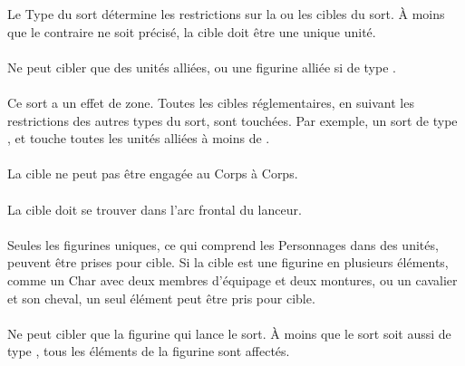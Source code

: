 Le Type du sort détermine les restrictions sur la ou les cibles du sort. À moins que le contraire ne soit précisé, la cible doit être une unique unité.

\paragraph{\augment}

Ne peut cibler que des unités alliées, ou une figurine alliée si de type \focused{}.

\paragraph{\aura}

Ce sort a un effet de zone. Toutes les cibles réglementaires, en suivant les restrictions des autres types du sort, sont touchées. Par exemple, un sort de type \aura{}, \augment{} et  touche toutes les unités alliées à moins de .

\paragraph{\damage}

La cible ne peut pas être engagée au Corps à Corps.

\paragraph{\direct}

La cible doit se trouver dans l'arc frontal du lanceur.

\paragraph{\focused}

Seules les figurines uniques, ce qui comprend les Personnages dans des unités, peuvent être prises pour cible. Si la cible est une figurine en plusieurs éléments, comme un Char avec deux membres d'équipage et deux montures, ou un cavalier et son cheval, un seul élément peut être pris pour cible.

\paragraph{\caster}

Ne peut cibler que la figurine qui lance le sort. À moins que le sort soit aussi de type \focused{}, tous les éléments de la figurine sont affectés.

